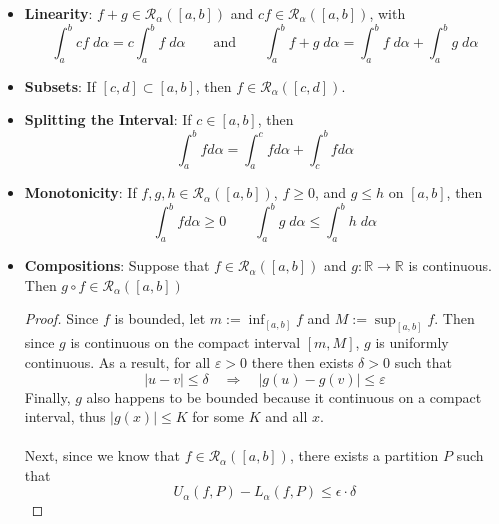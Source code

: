 \documentclass[12pt]{article}
\theoremstyle{plain}
\theoremstyle{definition}
\theoremstyle{remark}
\begin{document}
\begin{itemize}
    \item \textbf{Linearity}: $f+g \in \mathscr{R}_\alpha([a,b])$
        and $cf \in \mathscr{R}_\alpha([a,b])$, with 
        \[ \int^b_a cf \; d\alpha = c \int^b_a f\; d\alpha  
            \qquad \text{and} \qquad 
            \int^b_a f+g\; d\alpha = \int^b_a f \;d\alpha + 
            \int^b_a g\; d\alpha 
        \]
    \item \textbf{Subsets}: If $[c,d]\subset[a,b]$, then $f \in \mathscr{R}_\alpha([c,d])$.
    \item \textbf{Splitting the Interval}: If $c \in [a,b]$, then 
        \[ \int^b_a f d\alpha = \int^c_a f d\alpha 
            + \int^b_c f d\alpha \]
    \item \textbf{Monotonicity}: If $f,g,h \in 
        \mathscr{R}_\alpha([a,b])$, $f\geq0$, and
        $g \leq h$ on $[a,b]$, then
            \[ \int^b_a f d\alpha \geq 0 \qquad
                \int^b_a g \; d\alpha \leq 
                \int^b_a h \; d\alpha  \]
    \item \textbf{Compositions}: Suppose that $f \in 
        \mathscr{R}_\alpha([a,b])$ and
        $g: \mathbb{R}\rightarrow\mathbb{R}$ is 
        continuous. Then $g \circ f\in\mathscr{R}_\alpha([a,b])$
        \begin{proof}
            Since $f$ is bounded, 
            let $m:=\inf_{[a,b]}f$ and $M:=\sup_{[a,b]}f$.
            Then since $g$ is continuous on the compact 
            interval $[m,M]$, $g$ is uniformly continuous.
            As a result, for all $\varepsilon>0$
            there then exists $\delta>0$ such that 
            \begin{equation}
                \label{cont}
                 |u- v| \leq \delta \quad \Rightarrow
                    \quad |g(u) - g(v)| \leq \varepsilon
            \end{equation}
            Finally, $g$ also happens to be bounded because it
            continuous on a compact interval, thus $|g(x)| \leq K$
            for some $K$ and all $x$.
            \\
            \\
            Next, since we know that $f \in 
            \mathscr{R}_\alpha([a,b])$, 
            there exists a partition $P$ such that
            \begin{equation}
                \label{forf}
                 U_\alpha(f,P)- L_\alpha(f,P) \leq \epsilon\cdot
                    \delta
            \end{equation}

\end{proof}
\end{itemize}
\end{document}
